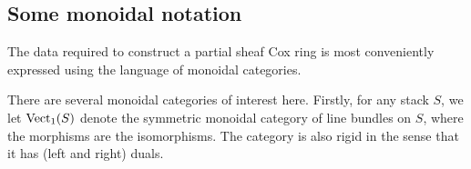 \documentclass[12pt]{amsart}
\begin{document}





\subsection{Some monoidal notation}  \label{ssec:monoidal}
The data required to construct a partial sheaf Cox ring is most conveniently expressed using the language of monoidal categories. 

There are several monoidal categories of interest here. 
Firstly, for any stack $S$, we let $\operatorname{Vect}_1 (S)$ denote the symmetric monoidal category of line bundles on $S$, where the morphisms are the isomorphisms. 
The category is also rigid in the sense that it has (left and right) duals. 
\end{document}
